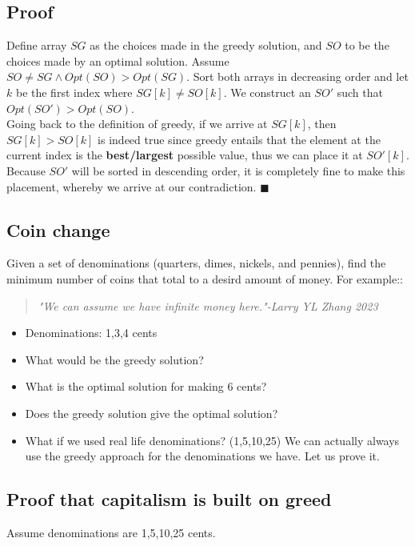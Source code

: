 \documentclass[12pt]{book}
\begin{document}
\subsection*{Proof}

Define array $SG$ as the choices made in the greedy solution, and $SO$ to be the choices made by an optimal solution. Assume $SO\neq SG\land Opt(SO)>Opt(SG)$. Sort both arrays in decreasing order and let $k$ be the first index where $SG[k]\neq SO[k]$. We construct an $SO'$ such that $Opt(SO')>Opt(SO)$.\\

Going back to the definition of greedy, if we arrive at $SG[k]$, then $SG[k]>SO[k]$ is indeed true since greedy entails that the element at the current index is the \textbf{best/largest} possible value, thus we can place it at $SO'[k]$. Because $SO'$ will be sorted in descending order, it is completely fine to make this placement, whereby we arrive at our contradiction. $\blacksquare$

\subsection*{Coin change}

Given a set of denominations (quarters, dimes, nickels, and pennies), find the minimum number of coins that total to a desird amount of money. For example::

\begin{quote}
    \textit{"We can assume we have infinite money here."-Larry YL Zhang 2023}
\end{quote}

\begin{itemize}
    \item Denominations: 1,3,4 cents
    \item What would be the greedy solution?
    \item What is the optimal solution for making 6 cents?
    \item Does the greedy solution give the optimal solution?
    \item What if we used real life denominations? (1,5,10,25) We can actually always use the greedy approach for the denominations we have. Let us prove it.
\end{itemize}

\subsection*{Proof that capitalism is built on greed}
Assume denominations are 1,5,10,25 cents.\\
\end{document}
